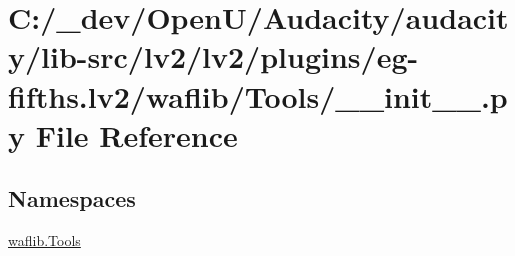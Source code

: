 \hypertarget{lv2_2lv2_2plugins_2eg-fifths_8lv2_2waflib_2_tools_2____init_____8py}{}\section{C\+:/\+\_\+dev/\+Open\+U/\+Audacity/audacity/lib-\/src/lv2/lv2/plugins/eg-\/fifths.lv2/waflib/\+Tools/\+\_\+\+\_\+init\+\_\+\+\_\+.py File Reference}
\label{lv2_2lv2_2plugins_2eg-fifths_8lv2_2waflib_2_tools_2____init_____8py}
\subsection*{Namespaces}
\begin{DoxyCompactItemize}
\item 
 \hyperlink{namespacewaflib_1_1_tools}{waflib.\+Tools}
\end{DoxyCompactItemize}
